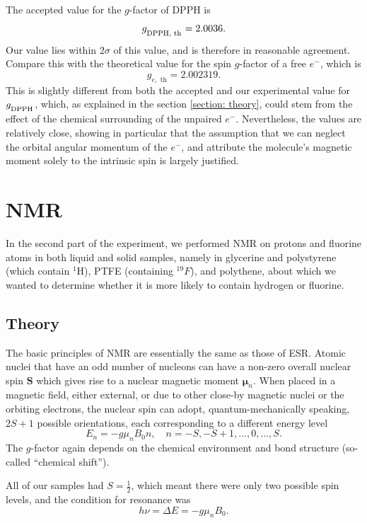 \documentclass[a4paper]{jpconf}
\numberwithin{equation}{section}
\begin{document}
The accepted value for the $g$-factor of DPPH is
\[
	g_{\textsubscript{DPPH, th}} = 2.0036.
\]
Our value lies within $2\sigma$ of this value, and is therefore in reasonable agreement.
Compare this with the theoretical value for the spin $g$-factor of a free $e^-$, which is
\[
	g_{e,\text{ th}} = 2.002319.
\]
This is slightly different from both the accepted and our experimental value for $g_{\textsubscript{DPPH}}$, which, as explained in the section \ref{section: theory}, could stem from the effect of the chemical surrounding of the unpaired $e^-$. Nevertheless, the values are relatively close, showing in particular that the assumption that we can neglect the orbital angular momentum of the $e^-$, and attribute the molecule's magnetic moment solely to the intrinsic spin is largely justified.


\section{NMR} 
In the second part of the experiment, we performed NMR on protons and fluorine atoms in both liquid and solid samples, namely in glycerine and polystyrene (which contain ${}^1$H), PTFE (containing ${}^{19}F$), and polythene, about which we wanted to determine whether it is more likely to contain hydrogen or fluorine.
\subsection{Theory}

The basic principles of NMR are essentially the same as those of ESR. Atomic nuclei that have an odd number of nucleons can have a non-zero overall nuclear spin $\mathbf{S}$ which gives rise to a nuclear magnetic moment $\bm{\mu}_n$. When placed in a magnetic field, either external, or due to other close-by magnetic nuclei or the orbiting electrons, the nuclear spin can adopt, quantum-mechanically speaking, $2S + 1$ possible orientations, each corresponding to a different energy level
\[
	E_n = -g \mu_n B_0 n, \quad n = -S, -S+1, \dots, 0, \dots, S. 
\] 
The $g$-factor again depends on the chemical environment and bond structure (so-called ``chemical shift''). 

All of our samples had $S = \tfrac{1}{2}$, which meant there were only two possible spin levels, and the condition for resonance was 
\begin{equation}\label{eqn: NMR resonance condition}
	h\nu = \Delta E = -g \mu_n B_0.
\end{equation}
\end{document}

